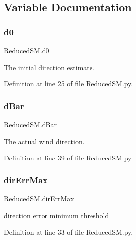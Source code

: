 \subsection{Variable Documentation}
\mbox{\label{namespace_reduced_s_m_af7214d9d46df1ff209b258941ec86497}} 
\subsubsection{\texorpdfstring{d0}{d0}}
{\footnotesize\ttfamily Reduced\+S\+M.\+d0}



The initial direction estimate. 



Definition at line 25 of file Reduced\+S\+M.\+py.

\mbox{\label{namespace_reduced_s_m_a54a76d567f185562d0afbd302b2764ab}} 
\subsubsection{\texorpdfstring{d\+Bar}{dBar}}
{\footnotesize\ttfamily Reduced\+S\+M.\+d\+Bar}



The actual wind direction. 



Definition at line 39 of file Reduced\+S\+M.\+py.

\mbox{\label{namespace_reduced_s_m_ae6a8b93203810f4021fccd67a05f51e7}} 
\subsubsection{\texorpdfstring{dir\+Err\+Max}{dirErrMax}}
{\footnotesize\ttfamily Reduced\+S\+M.\+dir\+Err\+Max}



direction error minimum threshold 



Definition at line 33 of file Reduced\+S\+M.\+py.

\mbox{\label{namespace_reduced_s_m_a2e00f0fe37b83224dc19800e4eb332a4}} 
